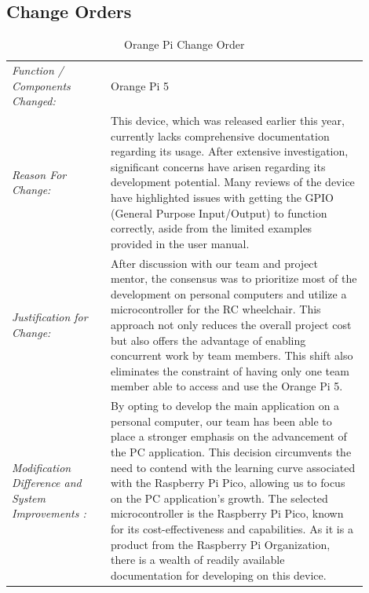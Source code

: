 \documentclass[conference]{IEEEtran}
\begin{document}
\subsection{Change Orders}
    \begin{table}[!ht]%
        \centering
            \begin{tabular}{|>{\columncolor{black!5}}p{0.25\linewidth}|>{}p{0.65\linewidth}|}
            
            \hline
            \rowcolor{black!20} 
             \multicolumn{2}{|c|}{\textbf{Change Order Form}} %
            \\ \hline

            \textit{Function / Components Changed: } & Orange Pi 5  
            
            \\ \hline

            \textit{Reason For Change:} & This device, which was released earlier this year, currently lacks comprehensive documentation regarding its usage. After extensive investigation, significant concerns have arisen regarding its development potential. Many reviews of the device have highlighted issues with getting the GPIO (General Purpose Input/Output) to function correctly, aside from the limited examples provided in the user manual.  

            \\ \hline

            \textit{Justification for Change:} & After discussion with our team and project mentor, the consensus was to prioritize most of the development on personal computers and utilize a microcontroller for the RC wheelchair. This approach not only reduces the overall project cost but also offers the advantage of enabling concurrent work by team members. This shift also eliminates the constraint of having only one team member able to access and use the Orange Pi 5. 

            \\ \hline

            \textit{Modification Difference and System Improvements :} & By opting to develop the main application on a personal computer, our team has been able to place a stronger emphasis on the advancement of the PC application. This decision circumvents the need to contend with the learning curve associated with the Raspberry Pi Pico, allowing us to focus on the PC application's growth. The selected microcontroller is the Raspberry Pi Pico, known for its cost-effectiveness and capabilities. As it is a product from the Raspberry Pi Organization, there is a wealth of readily available documentation for developing on this device. 

            \\ \hline

           \end{tabular}           
        \caption{Orange Pi Change Order}
        \label{tab:orange_pi_change_order}
    \end{table}
\end{document}

